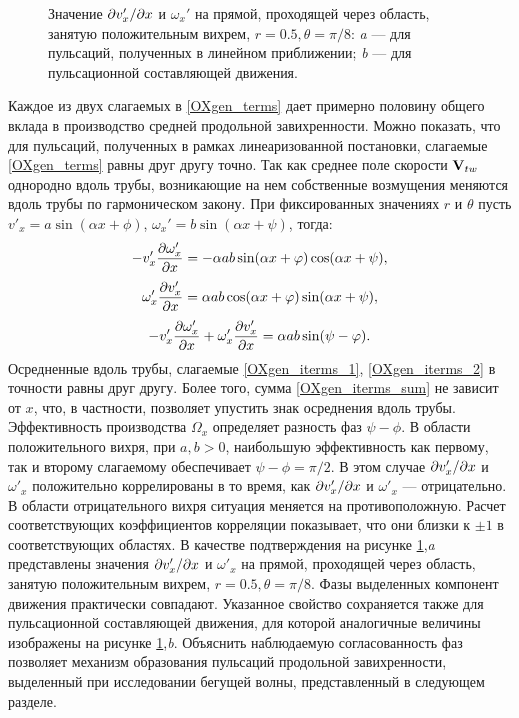 \begin{figure}
\caption{Значение $\partial v_x' /\partial x$ и $\omega_x'$ на прямой, проходящей через область, занятую положительным вихрем, $r = 0.5, \theta = \pi/8$: {\it a} --- для пульсаций, полученных в линейном приближении; {\it b} --- для пульсационной составляющей движения. }
\label{OXgen_corr_pic}
\end{figure}


Каждое из двух слагаемых в \eqref{OXgen_terms} дает примерно половину общего вклада в производство средней продольной завихренности. Можно показать, что для пульсаций, полученных в рамках линеаризованной постановки, слагаемые \eqref{OXgen_terms} равны друг другу точно. Так как среднее поле скорости $\mathbf{V}_{tw}$ однородно вдоль трубы, возникающие на нем собственные возмущения меняются вдоль трубы по гармоническом закону. При фиксированных значениях $r$ и $\theta$ пусть  $v'_x = a \sin(\alpha x + \phi)$, $\omega_x' = b \sin(\alpha x + \psi)$, тогда:
\begin{equation} \label{OXgen_iterms_1}
 - v'_x \frac{\partial \omega'_x}{\partial x} = - \alpha a b \sin(\alpha x + \varphi) \cos(\alpha x + \psi),
\end{equation}
\begin{equation} \label{OXgen_iterms_2}
\omega'_x \frac{\partial v'_x}{\partial x} =  \alpha a b \cos(\alpha x + \varphi) \sin(\alpha x + \psi),
\end{equation}
\begin{equation} \label{OXgen_iterms_sum}
 - v'_x \frac{\partial \omega'_x}{\partial x} + \omega'_x \frac{\partial v'_x}{\partial x} = \alpha a b \sin(\psi - \varphi).
\end{equation}
Осредненные вдоль трубы, слагаемые \eqref{OXgen_iterms_1}, \eqref{OXgen_iterms_2} в точности равны друг другу. Более того, сумма \eqref{OXgen_iterms_sum} не зависит от $x$, что, в частности, позволяет упустить знак осреднения вдоль трубы. Эффективность производства  $\Omega_x$ определяет разность фаз $\psi - \phi$. В области положительного вихря, при $a,b > 0$, наибольшую эффективность как первому, так и второму слагаемому обеспечивает $\psi - \phi = \pi/2$. В этом случае $\partial v'_x/\partial x$ и $\omega'_x$ положительно коррелированы в то время, как $\partial v'_x/\partial x$ и $\omega'_x$ --- отрицательно. В области отрицательного вихря ситуация меняется на противоположную. Расчет соответствующих коэффициентов корреляции показывает, что они близки к $\pm1$ в соответствующих областях. В качестве подтверждения на рисунке \ref{OXgen_corr_pic},{\it a} представлены значения $\partial v'_x/\partial x$ и $\omega'_x$ на прямой, проходящей через область, занятую положительным вихрем, $r = 0.5, \theta = \pi/8$. Фазы выделенных компонент движения практически совпадают. Указанное свойство сохраняется также для пульсационной составляющей движения, для которой аналогичные величины изображены на рисунке \ref{OXgen_corr_pic},{\it b}. Объяснить наблюдаемую согласованность фаз позволяет механизм образования пульсаций продольной завихренности, выделенный при исследовании бегущей волны, представленный в следующем разделе. 


